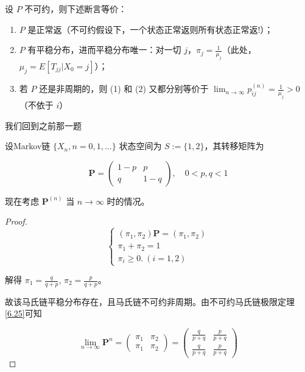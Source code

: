 \documentclass[lang=cn,10pt,thmcnt=section]{elegantbook}
\begin{document}
\begin{theorem}[不可约马氏链的极限定理]	\label{6.25}
	设 \( P \) 不可约，则下述断言等价：
\begin{enumerate}
    \item \( P \) 是正常返（不可约假设下，一个状态正常返则所有状态正常返!）；
    \item \( P \) 有平稳分布，进而平稳分布唯一：对一切 \( j \)，\( \pi_j = \frac{1}{\mu_j} \)（此处，\( \mu_j = E[T_{jj} | X_0 = j] \)）；
    \item 若 \( P \) 还是非周期的，则 (1) 和 (2) 又都分别等价于 \( \lim_{n \to \infty} p_{ij}^{(n)} = \frac{1}{\mu_j} > 0 \)（不依于 \( i \)）
\end{enumerate}
\end{theorem}

我们回到之前那一题
\begin{example}
	设Markov链 \(\{X_n, n = 0, 1, \ldots\}\) 状态空间为 \( S := \{1, 2\} \)，其转移矩阵为

\[
\mathbf{P} = \left(
\begin{array}{cc}
1-p & p \\
q & 1-q
\end{array}
\right), \quad 0 < p, q < 1
\]

现在考虑 \(\mathbf{P}^{(n)}\) 当 \(n \to \infty\) 时的情况。

\end{example}
\begin{proof}
	\begin{equation}
		\begin{cases}
		(\pi_1, \pi_2) \mathbf{P} = (\pi_1, \pi_2) \\
		\pi_1 + \pi_2 = 1 \\
		\pi_i \geq 0. \ (i = 1, 2)
		\end{cases}
		\end{equation}
		
		解得 \(\pi_1 = \frac{q}{q+p}\), \(\pi_2 = \frac{p}{q+p}\)。
		
		故该马氏链平稳分布存在，且马氏链不可约非周期。由不可约马氏链极限定理\ref{6.25}可知
		
		\[
		\lim_{n \to \infty} \mathbf{P}^n = \left(
		\begin{array}{cc}
		\pi_1 & \pi_2 \\
		\pi_1 & \pi_2
		\end{array}
		\right) = \left(
		\begin{array}{cc}
		\frac{q}{p+q} & \frac{p}{p+q} \\
		\frac{q}{p+q} & \frac{p}{p+q}
		\end{array}
		\right)
		\]
	
\end{proof}
\end{document}
